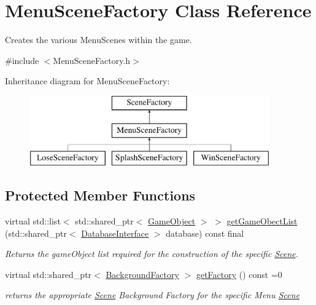 \hypertarget{class_menu_scene_factory}{}\section{Menu\+Scene\+Factory Class Reference}
\label{class_menu_scene_factory}


Creates the various Menu\+Scenes within the game.  




{\ttfamily \#include $<$Menu\+Scene\+Factory.\+h$>$}

Inheritance diagram for Menu\+Scene\+Factory\+:\begin{figure}[H]
\begin{center}
\leavevmode
\includegraphics[height=3.000000cm]{da/d10/class_menu_scene_factory}
\end{center}
\end{figure}
\subsection*{Protected Member Functions}
\begin{DoxyCompactItemize}
\item 
virtual std\+::list$<$ std\+::shared\+\_\+ptr$<$ \hyperlink{class_game_object}{Game\+Object} $>$ $>$ \hyperlink{class_menu_scene_factory_ade1881c377fa61d1d8fa11c1d30f4ddd}{get\+Game\+Obect\+List} (std\+::shared\+\_\+ptr$<$ \hyperlink{class_database_interface}{Database\+Interface} $>$ database) const final
\begin{DoxyCompactList}\small\item\em Returns the game\+Object list required for the construction of the specific \hyperlink{class_scene}{Scene}. \end{DoxyCompactList}\item 
virtual std\+::shared\+\_\+ptr$<$ \hyperlink{class_background_factory}{Background\+Factory} $>$ \hyperlink{class_menu_scene_factory_ad0f60a16fdbb10c6d7ba3311dafa2e76}{get\+Factory} () const =0
\begin{DoxyCompactList}\small\item\em returns the appropriate \hyperlink{class_scene}{Scene} Background Factory for the specific Menu \hyperlink{class_scene}{Scene} \end{DoxyCompactList}\end{DoxyCompactItemize}
